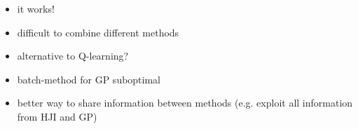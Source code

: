 \documentclass[../main.tex]{subfiles}
\begin{document}
\begin{itemize}
    \item it works!
    \item difficult to combine different methods
    \item alternative to Q-learning?
    \item batch-method for GP suboptimal
    \item better way to share information between methods (e.g. exploit all information from HJI and GP)
\end{itemize}
\end{document}
